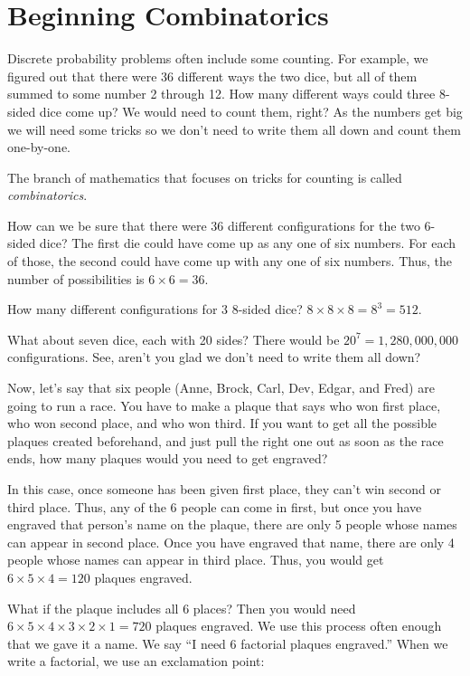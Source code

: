 \chapter{Beginning Combinatorics}

Discrete probability problems often include some counting. For
example, we figured out that there were 36 different ways the two dice, 
but all of them summed to some number 2 through 12. How
many different ways could three 8-sided dice come up? We would need to
count them, right? As the numbers get big we will need some tricks so
we don't need to write them all down and count them one-by-one.

The branch of mathematics that focuses on tricks for counting is
called \textit{combinatorics}.

How can we be sure that there were 36 different configurations for the
two 6-sided dice? The first die could have come up as any one of six
numbers. For each of those, the second could have come up with any one
of six numbers. Thus, the number of possibilities is $ 6 \times 6 =
36.$

How many different configurations for 3 8-sided dice?  $8 \times 8
\times 8 = 8^3 = 512$.

What about seven dice, each with 20 sides? There would be $20^7=1,280,000,000$
configurations. See, aren't you glad we don't need to write them all
down?

Now, let's say that six people (Anne, Brock, Carl, Dev, Edgar, and Fred) are
going to run a race. You have to make a plaque that says who won first
place, who won second place, and who won third. If you want to get all
the possible plaques created beforehand, and just pull the right one
out as soon as the race ends, how many plaques would you need to get
engraved?

In this case, once someone has been given first place, they can't win
second or third place. Thus, any of the 6 people can come in first,
but once you have engraved that person's name on the plaque, there are
only 5 people whose names can appear in second place. Once you have
engraved that name, there are only 4 people whose names can appear in
third place. Thus, you would get $6 \times 5 \times 4 = 120$ plaques
engraved.

What if the plaque includes all 6 places?  Then you would need $6 \times 5
\times 4 \times 3 \times 2 \times 1 = 720$ plaques engraved.  We use
this process often enough that we gave it a name.  We say ``I need 6
factorial plaques engraved.''  When we write a factorial, we use an
exclamation point:

